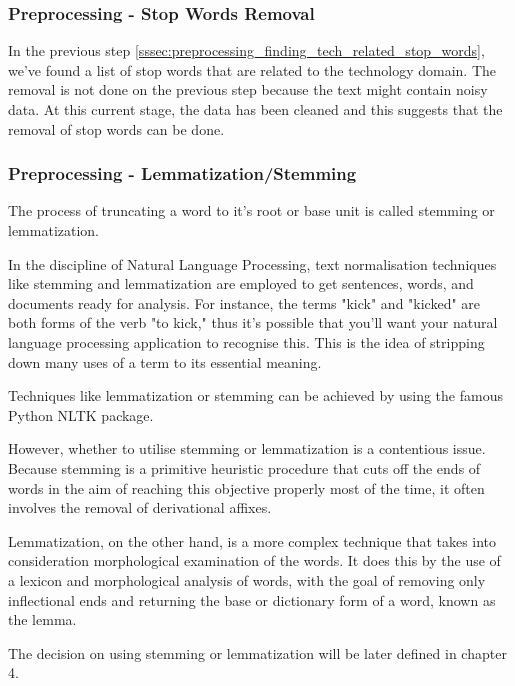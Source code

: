 \subsubsection{Preprocessing - Stop Words Removal}
In the previous step \ref{sssec:preprocessing_finding_tech_related_stop_words},  we've found a list of stop words that are related to the technology domain. The removal is not done on the previous step because the text might contain noisy data. At this current stage, the data has been cleaned and this suggests that the removal of stop words can be done.

\subsubsection{Preprocessing - Lemmatization/Stemming} \label{sssec:preprocessing_lemmatization_stemming}
The process of truncating a word to it's root or base unit is called stemming or lemmatization. 

In the discipline of Natural Language Processing, text normalisation techniques like stemming and lemmatization are employed to get sentences, words, and documents ready for analysis. For instance, the terms "kick" and "kicked" are both forms of the verb "to kick," thus it's possible that you'll want your natural language processing application to recognise this. This is the idea of stripping down many uses of a term to its essential meaning.

\pagebreak
\noindent Techniques like lemmatization or stemming can be achieved by using the famous Python NLTK package.

However, whether to utilise stemming or lemmatization is a contentious issue. Because stemming is a primitive heuristic procedure that cuts off the ends of words in the aim of reaching this objective properly most of the time, it often involves the removal of derivational affixes. 

Lemmatization, on the other hand, is a more complex technique that takes into consideration morphological examination of the words. It does this by the use of a lexicon and morphological analysis of words, with the goal of removing only inflectional ends and returning the base or dictionary form of a word, known as the lemma.

The decision on using stemming or lemmatization will be later defined in chapter 4.

\pagebreak
